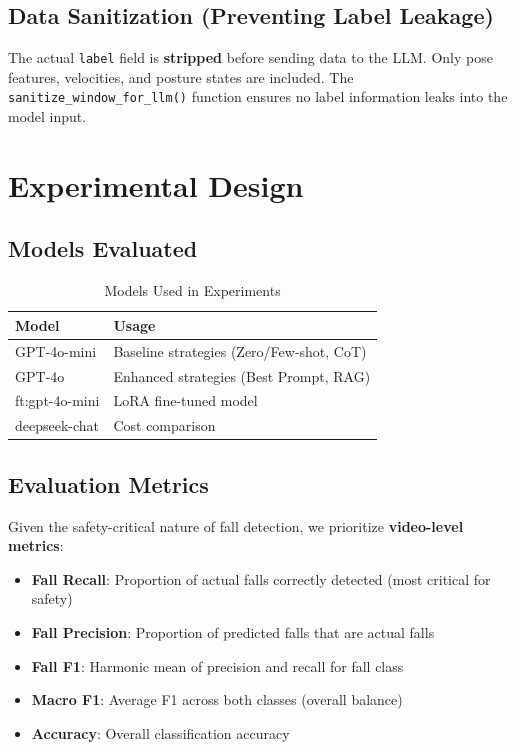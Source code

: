 \documentclass[conference]{IEEEtran}
\begin{document}
\subsection{Data Sanitization (Preventing Label Leakage)}

The actual \texttt{label} field is \textbf{stripped} before sending data to the LLM. Only pose features, velocities, and posture states are included. The \texttt{sanitize\_window\_for\_llm()} function ensures no label information leaks into the model input.

\section{Experimental Design}

\subsection{Models Evaluated}

\begin{table}[H]
\centering
\caption{Models Used in Experiments}
\label{tab:models}
\begin{tabular}{ll}
\toprule
\textbf{Model} & \textbf{Usage} \\
\midrule
GPT-4o-mini & Baseline strategies (Zero/Few-shot, CoT) \\
GPT-4o & Enhanced strategies (Best Prompt, RAG) \\
ft:gpt-4o-mini & LoRA fine-tuned model \\
deepseek-chat & Cost comparison \\
\bottomrule
\end{tabular}
\end{table}

\subsection{Evaluation Metrics}

Given the safety-critical nature of fall detection, we prioritize \textbf{video-level metrics}:

\begin{itemize}[leftmargin=*]
    \item \textbf{Fall Recall}: Proportion of actual falls correctly detected (most critical for safety)
    \item \textbf{Fall Precision}: Proportion of predicted falls that are actual falls
    \item \textbf{Fall F1}: Harmonic mean of precision and recall for fall class
    \item \textbf{Macro F1}: Average F1 across both classes (overall balance)
    \item \textbf{Accuracy}: Overall classification accuracy
\end{itemize}
\end{document}
